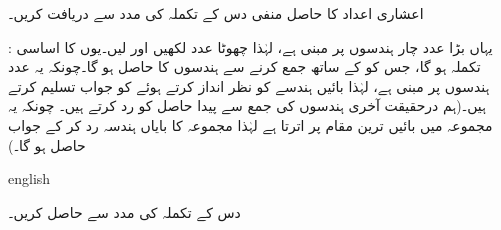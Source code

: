  اعشاری اعداد کا حاصل منفی  دس کے تکملہ کی مدد سے دریافت کریں۔ 
 
:\quad 
یہاں بڑا عدد  چار ہندسوں پر مبنی ہے، لہٰذا چھوٹا عدد  لکھیں اور  لیں۔یوں  کا اساسی تکملہ  ہو گا، جس کو  کے ساتھ جمع کرنے سے  ہندسوں کا   حاصل ہو گا۔چونکہ یہ عدد  ہندسوں پر مبنی ہے، لہٰذا بائیں ہندسے کو نظر انداز کرتے ہوئے  کو جواب تسلیم کرتے ہیں۔(ہم درحقیقت آخری ہندسوں کی جمع سے پیدا حاصل  کو رد کرتے ہیں۔ چونکہ یہ مجموعہ میں بائیں ترین مقام پر اترتا ہے لہٰذا مجموعہ کا بایاں ہندسہ رد کر کے جواب حاصل ہو گا۔)
\begin{center}
\begin{otherlanguage*}{english}
\begin{LTR}
\quad\quad
{}
\end{LTR}
\end{otherlanguage*}
\end{center}
دس کے تکملہ کی مدد سے  حاصل کریں۔ 

